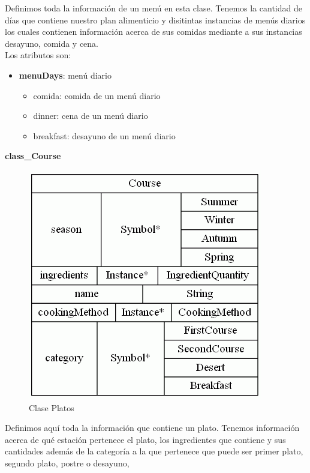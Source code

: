 \documentclass[12]{article}
\begin{document}
Definimos toda la información de un menú en esta clase. Tenemos la cantidad de días que contiene nuestro plan alimenticio y disitintas instancias de menús diarios los cuales contienen información acerca de sus comidas mediante a sus instancias desayuno, comida y cena. 
\\

Los atributos son: 
\begin{itemize}
\item \textbf{menuDays}: menú diario
	\begin{itemize}
	\item comida: comida de un menú diario
	\item dinner: cena de un menú diario
	\item breakfast: desayuno de un menú diario
	\end{itemize}
\end{itemize}

\vspace{0.5cm}

\textbf{class\_Course}
\begin{figure}[H]
\centering
\includegraphics[scale=0.5]{images/classCourse.png}
\caption{Clase Platos}
\label{platos}
\end{figure}

Definimos aquí toda la información que contiene un plato. Tenemos información acerca de qué estación pertenece el plato, los ingredientes que contiene y sus cantidades además de la categoría a la que pertenece que puede ser primer plato, segundo plato, postre o desayuno, 
\\
\end{document}
